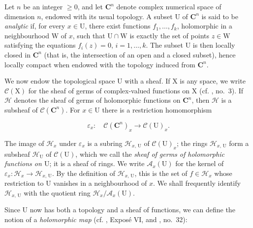 

Let $n$ be an integer $\geqslant 0$, and let $\mathbf{C}^n$ denote complex numerical space of dimension $n$, endowed with its usual topology. A subset $\mathrm{U}$ of $\mathbf{C}^n$ is said to be \emph{analytic} if, for every $x\in\mathrm{U}$, there exist functions $f_1,\ldots,f_k$, holomorphic in a neighbourhood $\mathrm{W}$ of $x$, such that $\mathrm{U}\cap\mathrm{W}$ is exactly the set of points $z\in\mathrm{W}$ satisfying the equations $f_i(z)=0$, $i=1,\ldots,k$. The subset $\mathrm{U}$ is then locally closed in $\mathbf{C}^n$ (that is, the intersection of an open and a closed subset), hence locally compact when endowed with the topology induced from $\mathbf{C}^n$.

We now endow the topological space $\mathrm{U}$ with a sheaf. If $\mathrm{X}$ is any space, we write $\mathcal{C}(\mathrm{X})$ for the sheaf of germs of complex-valued functions on $\mathrm{X}$ (cf. , no.~3). If $\mathcal{H}$ denotes the sheaf of germs of holomorphic functions on $\mathbf{C}^n$, then $\mathcal{H}$ is a subsheaf of $\mathcal{C}(\mathbf{C}^n)$. For $x\in\mathrm{U}$ there is a restriction homomorphism

\begin{equation*}
\varepsilon_x:\quad \mathcal{C}(\mathbf{C}^n)_x\longrightarrow\mathcal{C}(\mathrm{U})_x.
\end{equation*}

The image of $\mathcal{H}_x$ under $\varepsilon_x$ is a subring $\mathcal{H}_{x,\,\mathrm{U}}$ of $\mathcal{C}(\mathrm{U})_x$; the rings $\mathcal{H}_{x,\,\mathrm{U}}$ form a subsheaf $\mathcal{H}_{\mathrm{U}}$ of $\mathcal{C}(\mathrm{U})$, which we call the \emph{sheaf of germs of holomorphic functions on $\mathrm{U}$}; it is a sheaf of rings. We write $\mathcal{A}_x(\mathrm{U})$ for the kernel of $\varepsilon_x:\mathcal{H}_x\to\mathcal{H}_{x,\,\mathrm{U}}$. By the definition of $\mathcal{H}_{x,\,\mathrm{U}}$, this is the set of $f\in\mathcal{H}_x$ whose restriction to $\mathrm{U}$ vanishes in a neighbourhood of $x$. We shall frequently identify $\mathcal{H}_{x,\,\mathrm{U}}$ with the quotient ring $\mathcal{H}_x/\mathcal{A}_x(\mathrm{U})$.

Since $\mathrm{U}$ now has both a topology and a sheaf of functions, we can define the notion of a \emph{holomorphic map} (cf. , Expos\'e VI, and , no.~32):

